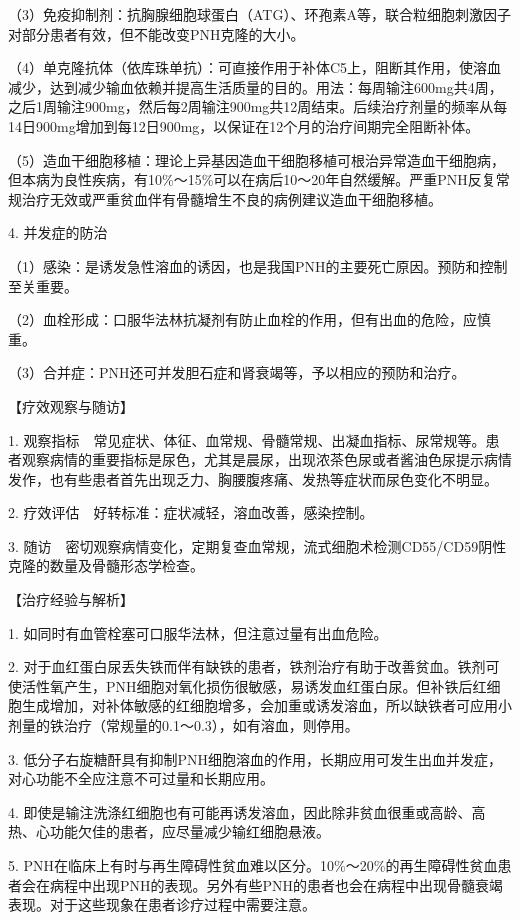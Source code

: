 （3）免疫抑制剂：抗胸腺细胞球蛋白（ATG）、环孢素A等，联合粒细胞刺激因子对部分患者有效，但不能改变PNH克隆的大小。

（4）单克隆抗体（依库珠单抗）：可直接作用于补体C5上，阻断其作用，使溶血减少，达到减少输血依赖并提高生活质量的目的。用法：每周输注600mg共4周，之后1周输注900mg，然后每2周输注900mg共12周结束。后续治疗剂量的频率从每14日900mg增加到每12日900mg，以保证在12个月的治疗间期完全阻断补体。

（5）造血干细胞移植：理论上异基因造血干细胞移植可根治异常造血干细胞病，但本病为良性疾病，有10\%～15\%可以在病后10～20年自然缓解。严重PNH反复常规治疗无效或严重贫血伴有骨髓增生不良的病例建议造血干细胞移植。

4. 并发症的防治

（1）感染：是诱发急性溶血的诱因，也是我国PNH的主要死亡原因。预防和控制至关重要。

（2）血栓形成：口服华法林抗凝剂有防止血栓的作用，但有出血的危险，应慎重。

（3）合并症：PNH还可并发胆石症和肾衰竭等，予以相应的预防和治疗。

【疗效观察与随访】

1.
观察指标　常见症状、体征、血常规、骨髓常规、出凝血指标、尿常规等。患者观察病情的重要指标是尿色，尤其是晨尿，出现浓茶色尿或者酱油色尿提示病情发作，也有些患者首先出现乏力、胸腰腹疼痛、发热等症状而尿色变化不明显。

2. 疗效评估　好转标准：症状减轻，溶血改善，感染控制。

3.
随访　密切观察病情变化，定期复查血常规，流式细胞术检测CD55/CD59阴性克隆的数量及骨髓形态学检查。

【治疗经验与解析】

1. 如同时有血管栓塞可口服华法林，但注意过量有出血危险。

2.
对于血红蛋白尿丢失铁而伴有缺铁的患者，铁剂治疗有助于改善贫血。铁剂可使活性氧产生，PNH细胞对氧化损伤很敏感，易诱发血红蛋白尿。但补铁后红细胞生成增加，对补体敏感的红细胞增多，会加重或诱发溶血，所以缺铁者可应用小剂量的铁治疗（常规量的0.1～0.3），如有溶血，则停用。

3.
低分子右旋糖酐具有抑制PNH细胞溶血的作用，长期应用可发生出血并发症，对心功能不全应注意不可过量和长期应用。

4.
即使是输注洗涤红细胞也有可能再诱发溶血，因此除非贫血很重或高龄、高热、心功能欠佳的患者，应尽量减少输红细胞悬液。

5.
PNH在临床上有时与再生障碍性贫血难以区分。10\%～20\%的再生障碍性贫血患者会在病程中出现PNH的表现。另外有些PNH的患者也会在病程中出现骨髓衰竭表现。对于这些现象在患者诊疗过程中需要注意。

